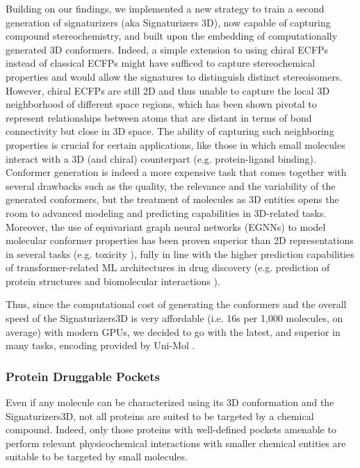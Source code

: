 Building on our findings, we implemented a new strategy to train a second generation of signaturizers (aka Signaturizers 3D), now capable of capturing compound stereochemistry, and built upon the embedding of computationally generated 3D conformers. Indeed, a simple extension to using chiral ECFPs instead of classical ECFPs might have sufficed to capture stereochemical properties and would allow the signatures to distinguish distinct stereoisomers. However, chiral ECFPs are still 2D and thus unable to capture the local 3D neighborhood of different space regions, which has been shown pivotal to represent relationships between atoms that are distant in terms of bond connectivity but close in 3D space\cite{axen_simple_2017}. The ability of capturing such neighboring properties is crucial for certain applications, like those in which small molecules interact with a 3D (and chiral) counterpart (e.g. protein-ligand binding). Conformer generation is indeed a more expensive task that comes together with several drawbacks such as the quality, the relevance and the variability of the generated conformers, but the treatment of molecules as 3D entities opens the room to advanced modeling and predicting capabilities in 3D-related tasks. Moreover, the use of equivariant graph neural networks (EGNNs) to model molecular conformer properties has been proven superior than 2D representations in several tasks (e.g. toxicity \cite{cremer_equivariant_2023}), fully in line with the higher prediction capabilities of transformer-related ML architectures in drug discovery (e.g. prediction of protein structures and biomolecular interactions \cite{jumper_highly_2021, abramson_accurate_2024}).

Thus, since the computational cost of generating the conformers and the overall speed of the Signaturizers3D is very affordable (i.e. 16s per 1,000 molecules, on average) with modern GPUs, we decided to go with the latest, and superior in many tasks, encoding provided by Uni-Mol \cite{zhou_uni-mol_2022}. 

\subsubsection{Protein Druggable Pockets}

Even if any molecule can be characterized using its 3D conformation and the Signaturizers3D, not all proteins are suited to be targeted by a chemical compound. Indeed, only those proteins with well-defined pockets amenable to perform relevant physicochemical interactions with smaller chemical entities are suitable to be targeted by small molecules. 

